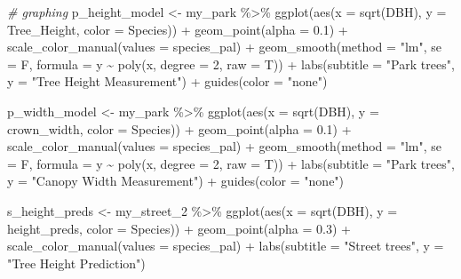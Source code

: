 \documentclass[12pt,twoside]{reedthesis}
\newenvironment{Shaded}{\begin{snugshade}}{\end{snugshade}}
\newcommand{\AttributeTok}[1]{\textcolor[rgb]{0.77,0.63,0.00}{#1}}
\newcommand{\CommentTok}[1]{\textcolor[rgb]{0.56,0.35,0.01}{\textit{#1}}}
\newcommand{\DecValTok}[1]{\textcolor[rgb]{0.00,0.00,0.81}{#1}}
\newcommand{\FloatTok}[1]{\textcolor[rgb]{0.00,0.00,0.81}{#1}}
\newcommand{\FunctionTok}[1]{\textcolor[rgb]{0.00,0.00,0.00}{#1}}
\newcommand{\NormalTok}[1]{#1}
\newcommand{\OtherTok}[1]{\textcolor[rgb]{0.56,0.35,0.01}{#1}}
\newcommand{\SpecialCharTok}[1]{\textcolor[rgb]{0.00,0.00,0.00}{#1}}
\newcommand{\StringTok}[1]{\textcolor[rgb]{0.31,0.60,0.02}{#1}}
\begin{document}
\begin{Shaded}
\begin{Highlighting}[]
\CommentTok{\# graphing}
\NormalTok{p\_height\_model }\OtherTok{\textless{}{-}}\NormalTok{ my\_park }\SpecialCharTok{\%\textgreater{}\%}
    \FunctionTok{ggplot}\NormalTok{(}\FunctionTok{aes}\NormalTok{(}\AttributeTok{x =} \FunctionTok{sqrt}\NormalTok{(DBH), }\AttributeTok{y =}\NormalTok{ Tree\_Height, }\AttributeTok{color =}\NormalTok{ Species)) }\SpecialCharTok{+}
    \FunctionTok{geom\_point}\NormalTok{(}\AttributeTok{alpha =} \FloatTok{0.1}\NormalTok{) }\SpecialCharTok{+} \FunctionTok{scale\_color\_manual}\NormalTok{(}\AttributeTok{values =}\NormalTok{ species\_pal) }\SpecialCharTok{+}
    \FunctionTok{geom\_smooth}\NormalTok{(}\AttributeTok{method =} \StringTok{"lm"}\NormalTok{, }\AttributeTok{se =}\NormalTok{ F, }\AttributeTok{formula =}\NormalTok{ y }\SpecialCharTok{\textasciitilde{}} \FunctionTok{poly}\NormalTok{(x,}
        \AttributeTok{degree =} \DecValTok{2}\NormalTok{, }\AttributeTok{raw =}\NormalTok{ T)) }\SpecialCharTok{+} \FunctionTok{labs}\NormalTok{(}\AttributeTok{subtitle =} \StringTok{"Park trees"}\NormalTok{,}
    \AttributeTok{y =} \StringTok{"Tree Height Measurement"}\NormalTok{) }\SpecialCharTok{+} \FunctionTok{guides}\NormalTok{(}\AttributeTok{color =} \StringTok{"none"}\NormalTok{)}

\NormalTok{p\_width\_model }\OtherTok{\textless{}{-}}\NormalTok{ my\_park }\SpecialCharTok{\%\textgreater{}\%}
    \FunctionTok{ggplot}\NormalTok{(}\FunctionTok{aes}\NormalTok{(}\AttributeTok{x =} \FunctionTok{sqrt}\NormalTok{(DBH), }\AttributeTok{y =}\NormalTok{ crown\_width, }\AttributeTok{color =}\NormalTok{ Species)) }\SpecialCharTok{+}
    \FunctionTok{geom\_point}\NormalTok{(}\AttributeTok{alpha =} \FloatTok{0.1}\NormalTok{) }\SpecialCharTok{+} \FunctionTok{scale\_color\_manual}\NormalTok{(}\AttributeTok{values =}\NormalTok{ species\_pal) }\SpecialCharTok{+}
    \FunctionTok{geom\_smooth}\NormalTok{(}\AttributeTok{method =} \StringTok{"lm"}\NormalTok{, }\AttributeTok{se =}\NormalTok{ F, }\AttributeTok{formula =}\NormalTok{ y }\SpecialCharTok{\textasciitilde{}} \FunctionTok{poly}\NormalTok{(x,}
        \AttributeTok{degree =} \DecValTok{2}\NormalTok{, }\AttributeTok{raw =}\NormalTok{ T)) }\SpecialCharTok{+} \FunctionTok{labs}\NormalTok{(}\AttributeTok{subtitle =} \StringTok{"Park trees"}\NormalTok{,}
    \AttributeTok{y =} \StringTok{"Canopy Width Measurement"}\NormalTok{) }\SpecialCharTok{+} \FunctionTok{guides}\NormalTok{(}\AttributeTok{color =} \StringTok{"none"}\NormalTok{)}

\NormalTok{s\_height\_preds }\OtherTok{\textless{}{-}}\NormalTok{ my\_street\_2 }\SpecialCharTok{\%\textgreater{}\%}
    \FunctionTok{ggplot}\NormalTok{(}\FunctionTok{aes}\NormalTok{(}\AttributeTok{x =} \FunctionTok{sqrt}\NormalTok{(DBH), }\AttributeTok{y =}\NormalTok{ height\_preds, }\AttributeTok{color =}\NormalTok{ Species)) }\SpecialCharTok{+}
    \FunctionTok{geom\_point}\NormalTok{(}\AttributeTok{alpha =} \FloatTok{0.3}\NormalTok{) }\SpecialCharTok{+} \FunctionTok{scale\_color\_manual}\NormalTok{(}\AttributeTok{values =}\NormalTok{ species\_pal) }\SpecialCharTok{+}
    \FunctionTok{labs}\NormalTok{(}\AttributeTok{subtitle =} \StringTok{"Street trees"}\NormalTok{, }\AttributeTok{y =} \StringTok{"Tree Height Prediction"}\NormalTok{)}


\end{Highlighting}
\end{Shaded}
\end{document}
